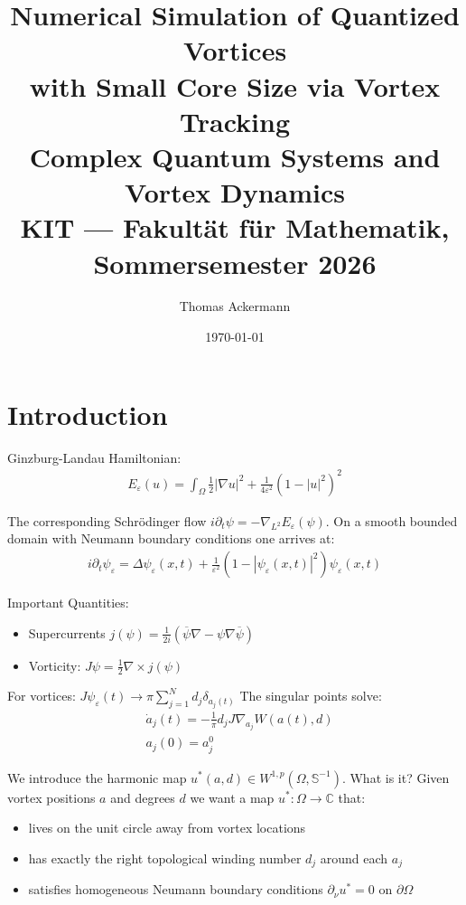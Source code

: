 \documentclass[12pt, a4paper]{article}
\title{
  \Large\textbf{Numerical Simulation of Quantized Vortices\\
  with Small Core Size via Vortex Tracking}\\[0.5em]
  \large Complex Quantum Systems and Vortex Dynamics\\
  KIT --- Fakultät für Mathematik, Sommersemester 2026
}
\author{Thomas Ackermann}
\date{\today}
\theoremstyle{plain}
\theoremstyle{definition}
\newcommand{\C}{\mathbb{C}}
\newcommand{\psieps}{\psi_\varepsilon}
\begin{document}
\maketitle
\thispagestyle{empty}

\section{Introduction}

Ginzburg-Landau Hamiltonian:
\begin{align}
    E_\varepsilon (u) = \int_\Omega \frac{1}{2} |\nabla u|^2 + \frac{1}{4 \varepsilon^2} (1- |u|^2)^2
\end{align}

The corresponding Schrödinger flow $i \partial_t \psi = - \nabla_{L^2} E_\varepsilon (\psi)$.
On a smooth bounded domain with Neumann boundary conditions one arrives at:
\begin{align}
  i \partial_t \psi_\varepsilon = \Delta \psieps (x,t) + \frac{1}{\varepsilon^2} (1- |\psieps (x,t)|^2) \psieps(x,t)
\end{align}

Important Quantities:
\begin{itemize}
  \item Supercurrents $j(\psi) = \frac{1}{2i}(\overline{\psi} \nabla - \psi \nabla \overline{\psi})$
  \item Vorticity: $J \psi = \frac{1}{2} \nabla \times j(\psi)$
\end{itemize}

For vortices:
$J \psieps (t) \to \pi \sum^N_{j=1} d_j \delta_{a_j (t)}$
The singular points solve:
\begin{align}
  &\dot a_j (t) = - \frac{1}{\pi} d_j J \nabla_{a_j} W(a(t), d) \\
  &a_j(0) = a^0_j
\end{align}


We introduce the harmonic map $u^* (a,d) \in W^{1,p}(\Omega , \mathbb S^{-1})$. 
What is it?
Given vortex positions $a$ and degrees $d$ we want a map $u^*: \Omega \to \C$ that:
\begin{itemize}
  \item lives on the unit circle away from vortex locations
  \item has exactly the right topological winding number $d_j$ around each $a_j$
  \item satisfies homogeneous Neumann boundary conditions $\partial_\nu u^* = 0$ on $\partial \Omega$
\end{itemize}
\end{document}
